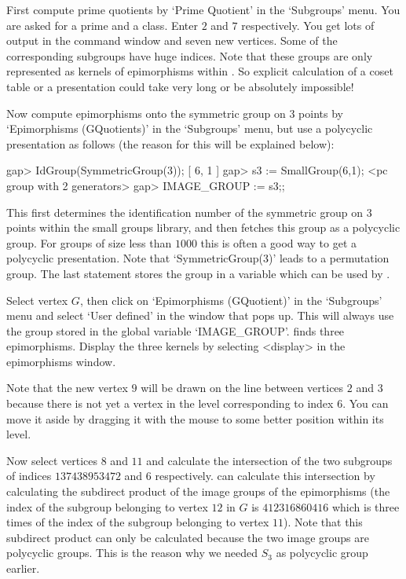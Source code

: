 First compute prime quotients by `Prime Quotient' in the `Subgroups'
menu. You are asked for a prime and a class. Enter $2$ and $7$
respectively. You get lots of output in the {\GAP} command window and
seven new vertices. Some of the corresponding subgroups have huge
indices. Note that these groups are only represented as kernels of
epimorphisms within {\GAP}. So explicit calculation of a coset table
or a presentation could take very long or be absolutely impossible!

Now compute epimorphisms onto the symmetric group on $3$ points by
`Epimorphisms (GQuotients)' in the `Subgroups' menu, but use a polycyclic 
presentation as follows (the reason for this will be explained below):

\begintt
gap> IdGroup(SymmetricGroup(3));
[ 6, 1 ]
gap> s3 := SmallGroup(6,1);
<pc group with 2 generators>
gap> IMAGE_GROUP := s3;;
\endtt

This first determines the identification number of the symmetric group 
on $3$ points within the small groups library, and then fetches this
group as a polycyclic group. For groups of size less than $1000$ this
is often a good way to get a polycyclic presentation. Note that
`SymmetricGroup(3)' leads to a permutation group. The last statement
stores the group in a variable which can be used by {\XGAP}. 

Select vertex $G$, then click on `Epimorphisms (GQuotient)' in the
`Subgroups' menu and select `User defined' in the window that pops up.
This will always use the group stored in the global variable
`IMAGE_GROUP'. {\GAP} finds three epimorphisms. Display the three
kernels by selecting <display> in the epimorphisms window.

Note that the new vertex $9$ will be drawn on the line between
vertices $2$ and $3$ because there is not yet a vertex in the level
corresponding to index 6. You can move it aside by dragging it with
the mouse to some better position within its level.

Now select vertices $8$ and $11$ and calculate the intersection of the 
two subgroups of indices $137438953472$ and $6$ respectively. {\GAP}
can calculate this intersection by calculating the subdirect product
of the image groups of the epimorphisms (the index of the subgroup
belonging to vertex $12$ in $G$ is $412316860416$ which is three times
of the index of the subgroup belonging to vertex $11$). Note that this 
subdirect product can only be calculated because the two image groups
are polycyclic groups. This is the reason why we needed $S_3$ as
polycyclic group earlier.

